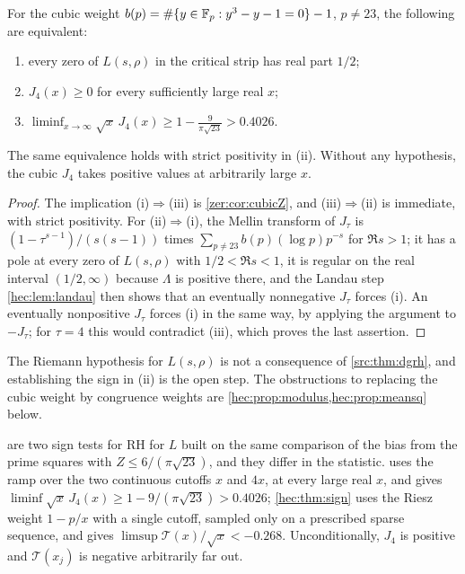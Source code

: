 \begin{theorem}\label{zer:thm:cubicrace}
For the cubic weight $b(p)=\#\{y\in\mathbb{F}_p:y^3-y-1=0\}-1$, $p\ne23$, the following are
equivalent:
\begin{enumerate}[label=\textup{(\roman*)}]
\item every zero of $L(s,\rho)$ in the critical strip has real part $1/2$;
\item $J_4(x)\ge0$ for every sufficiently large real $x$;
\item $\displaystyle\liminf_{x\to\infty}\sqrt x\,J_4(x)\ge1-\frac9{\pi\sqrt{23}}>0.4026$.
\end{enumerate}
The same equivalence holds with strict positivity in \textup{(ii)}. Without any hypothesis,
the cubic $J_4$ takes positive values at arbitrarily large $x$.
\end{theorem}
\begin{proof}
The implication (i)$\Rightarrow$(iii) is \cref{zer:cor:cubicZ}, and (iii)$\Rightarrow$(ii) is
immediate, with strict positivity. For (ii)$\Rightarrow$(i), the Mellin transform of
$J_\tau$ is $(1-\tau^{s-1})/(s(s-1))$ times $\sum_{p\ne23}b(p)(\log p)p^{-s}$ for
$\Re s>1$; it has a pole at every zero of $L(s,\rho)$ with $1/2<\Re s<1$, it is regular on
the real interval $(1/2,\infty)$ because $\Lambda$ is positive there, and the Landau step
\cref{hec:lem:landau} then shows that an eventually nonnegative $J_\tau$ forces (i). An
eventually nonpositive $J_\tau$ forces (i) in the same way, by applying the argument to
$-J_\tau$; for $\tau=4$ this would contradict (iii), which proves the last assertion.
\end{proof}

The Riemann hypothesis for $L(s,\rho)$ is not a consequence of \cref{src:thm:dgrh}, and
establishing the sign in (ii) is the open step. The obstructions to replacing the cubic
weight by congruence weights are \cref{hec:prop:modulus,hec:prop:meansq} below.

\begin{remark}\label{hec:rem:twoscale}
 are two sign tests for RH for $L$ built on the same comparison of the
bias from the prime squares with $Z\le6/(\pi\sqrt{23})$, and they differ in the statistic.
 uses the ramp over the two continuous cutoffs $x$ and $4x$, at every large real
$x$, and gives $\liminf\sqrt x\,J_4(x)\ge1-9/(\pi\sqrt{23})>0.4026$; \cref{hec:thm:sign} uses the Riesz
weight $1-p/x$ with a single cutoff, sampled only on a prescribed sparse sequence, and gives
$\limsup\mathcal T(x)/\sqrt x<-0.268$. Unconditionally, $J_4$ is positive and $\mathcal T(x_j)$ is negative
arbitrarily far out.
\end{remark}

